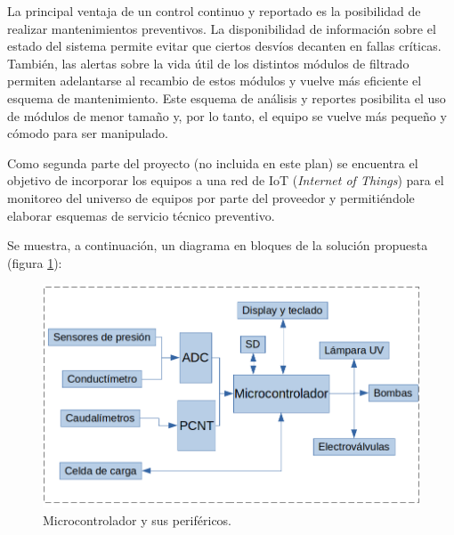 \documentclass[
11pt, %
]{charter}
\begin{document}
La principal ventaja de un control continuo y reportado es la posibilidad de realizar mantenimientos preventivos. La disponibilidad de información sobre el estado del sistema permite evitar que ciertos desvíos decanten en fallas críticas. 
También, las alertas sobre la vida útil de los distintos módulos de filtrado permiten adelantarse al recambio de estos módulos y vuelve más eficiente el esquema de mantenimiento. Este esquema de análisis y reportes posibilita el uso de módulos de menor tamaño y, por lo tanto, el equipo se vuelve más pequeño y cómodo para ser manipulado.


Como segunda parte del proyecto (no incluida en este plan) se encuentra el objetivo de incorporar los equipos a una red de IoT (\textit{Internet of Things}) para el monitoreo del universo de equipos por parte del proveedor y permitiéndole elaborar esquemas de servicio técnico preventivo.

Se muestra, a continuación, un diagrama en bloques de la solución propuesta (figura \ref{fig:microcontroladorConexiones}):

\begin{figure}[htpb]
\centering 
\includegraphics[width=.7\textwidth]{./Figuras/Microcontrolador y sus perifericos.png}
\caption{Microcontrolador y sus periféricos.}
\label{fig:microcontroladorConexiones}
\end{figure}

\vspace{25px}
\end{document}
